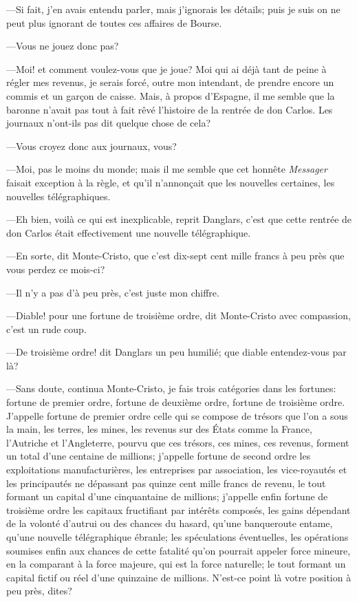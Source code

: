 —Si fait, j'en avais entendu parler, mais j'ignorais les détails; puis je suis on ne peut plus ignorant de toutes ces affaires de Bourse. 

—Vous ne jouez donc pas? 

—Moi! et comment voulez-vous que je joue? Moi qui ai déjà tant de peine à régler mes revenus, je serais forcé, outre mon intendant, de prendre encore un commis et un garçon de caisse. Mais, à propos d'Espagne, il me semble que la baronne n'avait pas tout à fait rêvé l'histoire de la rentrée de don Carlos. Les journaux n'ont-ils pas dit quelque chose de cela? 

—Vous croyez donc aux journaux, vous? 

—Moi, pas le moins du monde; mais il me semble que cet honnête \textit{Messager} faisait exception à la règle, et qu'il n'annonçait que les nouvelles certaines, les nouvelles télégraphiques. 

—Eh bien, voilà ce qui est inexplicable, reprit Danglars, c'est que cette rentrée de don Carlos était effectivement une nouvelle télégraphique. 

—En sorte, dit Monte-Cristo, que c'est dix-sept cent mille francs à peu près que vous perdez ce mois-ci? 

—Il n'y a pas d'à peu près, c'est juste mon chiffre. 

—Diable! pour une fortune de troisième ordre, dit Monte-Cristo avec compassion, c'est un rude coup. 

—De troisième ordre! dit Danglars un peu humilié; que diable entendez-vous par là? 

—Sans doute, continua Monte-Cristo, je fais trois catégories dans les fortunes: fortune de premier ordre, fortune de deuxième ordre, fortune de troisième ordre. J'appelle fortune de premier ordre celle qui se compose de trésors que l'on a sous la main, les terres, les mines, les revenus sur des États comme la France, l'Autriche et l'Angleterre, pourvu que ces trésors, ces mines, ces revenus, forment un total d'une centaine de millions; j'appelle fortune de second ordre les exploitations manufacturières, les entreprises par association, les vice-royautés et les principautés ne dépassant pas quinze cent mille francs de revenu, le tout formant un capital d'une cinquantaine de millions; j'appelle enfin fortune de troisième ordre les capitaux fructifiant par intérêts composés, les gains dépendant de la volonté d'autrui ou des chances du hasard, qu'une banqueroute entame, qu'une nouvelle télégraphique ébranle; les spéculations éventuelles, les opérations soumises enfin aux chances de cette fatalité qu'on pourrait appeler force mineure, en la comparant à la force majeure, qui est la force naturelle; le tout formant un capital fictif ou réel d'une quinzaine de millions. N'est-ce point là votre position à peu près, dites? 

